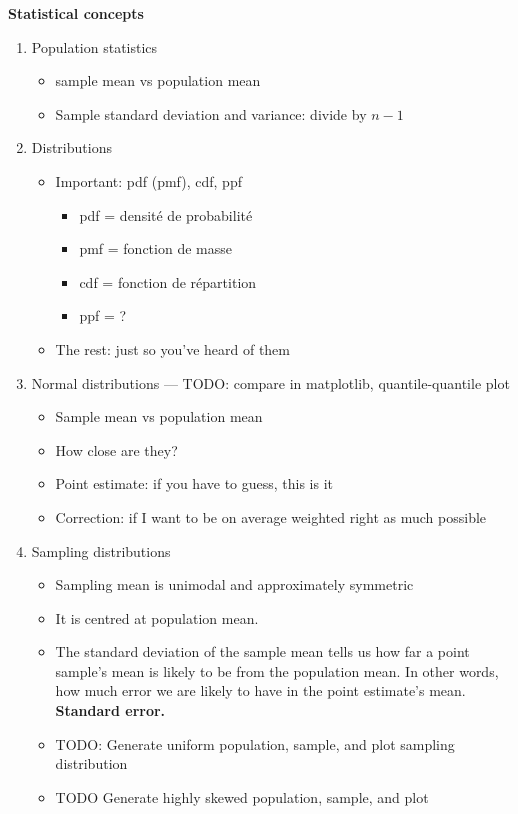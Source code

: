 \textbf{Statistical concepts}
\begin{enumerate}
\item Population statistics
  \begin{itemize}
  \item sample mean vs population mean
  \item Sample standard deviation and variance: divide by $n-1$
  \end{itemize}
\item Distributions
  \begin{itemize}
  \item Important: pdf (pmf), cdf, ppf
    \begin{itemize}
    \item pdf = densité de probabilité
    \item pmf = fonction de masse
    \item cdf = fonction de répartition
    \item ppf = ?
    \end{itemize}
  \item The rest: just so you've heard of them
  \end{itemize}
\item Normal distributions --- TODO: compare in matplotlib, quantile-quantile plot
  \begin{itemize}
  \item Sample mean vs population mean
  \item How close are they?
  \item Point estimate: if you have to guess, this is it
  \item Correction: if I want to be on average weighted right as much possible
  \end{itemize}
\item Sampling distributions
  \begin{itemize}
  \item Sampling mean is unimodal and approximately symmetric
  \item It is centred at population mean.
    \item The standard deviation of the sample mean tells us how far a
      point sample's mean is likely to be from the population mean.
      In other words, how much error we are likely to have in the
      point estimate's mean.  \textbf{Standard error.}
    \item TODO: Generate uniform population, sample,
      and plot sampling distribution
    \item TODO Generate highly skewed population, sample, and plot

\end{itemize}
\end{enumerate}
